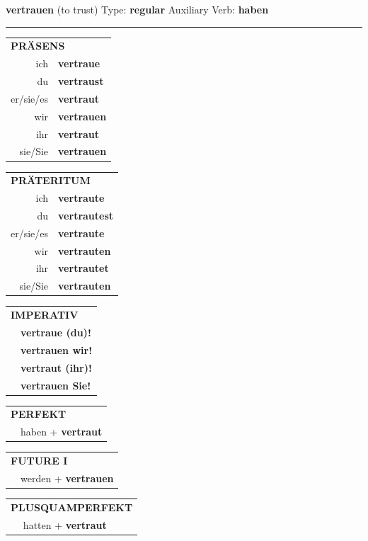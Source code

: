 \documentclass[10pt,a4paper]{revtex4-2}
\begin{document}
\begin{verbbox}
{\Large \bf vertrauen} (to trust) \hfill Type: \textbf{regular} \hfill Auxiliary Verb: \textbf{haben}

\vspace{5pt}
\hrule
\vspace{5pt}

\begin{tabular}{rl}
\multicolumn{2}{l}{\textbf{PRÄSENS}}\\
ich & \textbf{vertraue}\\
du & \textbf{vertraust}\\
er/sie/es & \textbf{vertraut}\\
wir & \textbf{vertrauen}\\
ihr & \textbf{vertraut}\\
sie/Sie & \textbf{vertrauen}\\
\end{tabular}
\hfill
\begin{tabular}{rl}
\multicolumn{2}{l}{\textbf{PRÄTERITUM}}\\
ich & \textbf{vertraute}\\
du & \textbf{vertrautest}\\
er/sie/es & \textbf{vertraute}\\
wir & \textbf{vertrauten}\\
ihr & \textbf{vertrautet}\\
sie/Sie & \textbf{vertrauten}\\
\end{tabular}
\hfill
\begin{tabular}{rl}
\multicolumn{2}{l}{\textbf{IMPERATIV}}\\
& \textbf{vertraue (du)!}\\
& \textbf{vertrauen wir!}\\
& \textbf{vertraut (ihr)!}\\
& \textbf{vertrauen Sie!}\\
\end{tabular}

\vspace{10pt}

\begin{tabular}{rl}
\multicolumn{2}{l}{\textbf{PERFEKT}}\\
& haben + \textbf{vertraut}\\
\end{tabular}
\hfill
\begin{tabular}{rl}
\multicolumn{2}{l}{\textbf{FUTURE I}}\\
& werden + \textbf{vertrauen}\\
\end{tabular}
\hfill
\begin{tabular}{rl}
\multicolumn{2}{l}{\textbf{PLUSQUAMPERFEKT}}\\
& hatten + \textbf{vertraut}\\
\end{tabular}


\end{verbbox}
\end{document}
